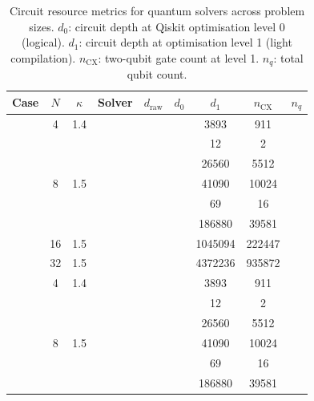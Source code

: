 \begin{table}[htbp]
  \centering
  \caption{Circuit resource metrics for quantum solvers across problem sizes. $d_0$: circuit depth at Qiskit optimisation level 0 (logical). $d_1$: circuit depth at optimisation level 1 (light compilation). $n_\mathrm{CX}$: two-qubit gate count at level 1. $n_q$: total qubit count.}
  \label{tab:circuit_resources}
  \begin{tabular}{l S[table-format=3.0] S[table-format=4.1] l S[table-format=6.0] S[table-format=6.0] S[table-format=6.0] S[table-format=5.0] S[table-format=2.0]}
    \toprule
    {Case} & {$N$} & {$\kappa$} & {Solver} & {$d_\mathrm{raw}$} & {$d_0$} & {$d_1$} & {$n_\mathrm{CX}$} & {$n_q$} \\
    \midrule
     & 4 & 1.4 &  & {\text{---}} & {\text{---}} & 3893 & 911 & {\text{---}} \\
     &  &  &  & {\text{---}} & {\text{---}} & 12 & 2 & {\text{---}} \\
     &  &  &  & {\text{---}} & {\text{---}} & 26560 & 5512 & {\text{---}} \\
     & 8 & 1.5 &  & {\text{---}} & {\text{---}} & 41090 & 10024 & {\text{---}} \\
     &  &  &  & {\text{---}} & {\text{---}} & 69 & 16 & {\text{---}} \\
     &  &  &  & {\text{---}} & {\text{---}} & 186880 & 39581 & {\text{---}} \\
     & 16 & 1.5 &  & {\text{---}} & {\text{---}} & 1045094 & 222447 & {\text{---}} \\
     & 32 & 1.5 &  & {\text{---}} & {\text{---}} & 4372236 & 935872 & {\text{---}} \\
    \midrule
     & 4 & 1.4 &  & {\text{---}} & {\text{---}} & 3893 & 911 & {\text{---}} \\
     &  &  &  & {\text{---}} & {\text{---}} & 12 & 2 & {\text{---}} \\
     &  &  &  & {\text{---}} & {\text{---}} & 26560 & 5512 & {\text{---}} \\
     & 8 & 1.5 &  & {\text{---}} & {\text{---}} & 41090 & 10024 & {\text{---}} \\
     &  &  &  & {\text{---}} & {\text{---}} & 69 & 16 & {\text{---}} \\
     &  &  &  & {\text{---}} & {\text{---}} & 186880 & 39581 & {\text{---}} \\

\end{tabular}
\end{table}
